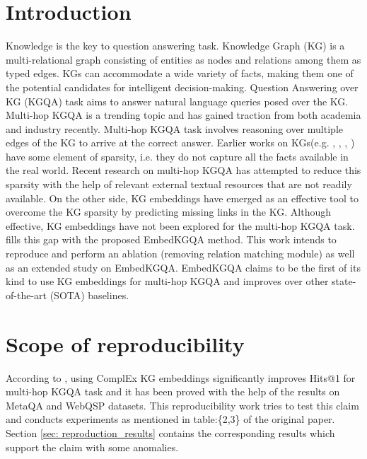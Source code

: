 
\section{Introduction}

Knowledge is the key to question answering task. Knowledge Graph (KG) is a multi-relational
graph consisting of entities as nodes and relations among them as typed edges. KGs can accommodate a wide variety of facts, making them one of the potential candidates for intelligent decision-making. Question Answering over KG (KGQA) task aims to answer natural language queries posed over the KG. Multi-hop KGQA is a trending topic and has gained traction from both academia and industry recently. Multi-hop KGQA task involves reasoning over multiple edges of the KG to arrive at the correct answer. Earlier works on KGs(e.g. \cite{yago}, \cite{freebase:datadumps}, \cite{dbpedia2015}, \cite{NELL}) have some element of sparsity, i.e. they do not capture all the facts available in the real world. Recent research on multi-hop KGQA has attempted to reduce this sparsity with the help of relevant external textual resources that are not readily available. On the other side, KG embeddings have emerged as an effective tool to overcome the KG sparsity by predicting missing links in the KG. Although effective, KG embeddings have not been explored for the multi-hop KGQA task. \cite{saxena-etal-2020-improving} fills this gap with the proposed EmbedKGQA method. This work intends to reproduce and perform an ablation (removing relation matching module) as well as an extended study on EmbedKGQA\cite{saxena-etal-2020-improving}. EmbedKGQA claims to be the first of its kind to use KG embeddings for multi-hop KGQA and improves over other state-of-the-art (SOTA) baselines.

\section{Scope of reproducibility}
\label{sec:claims}

According to \cite{saxena-etal-2020-improving}, using ComplEx \cite{ComplEx2016} KG embeddings significantly improves Hits@1 for multi-hop KGQA task and it has been proved with the help of the results on MetaQA \cite{metaqa-dataset} and WebQSP \cite{webqsp-dataset} datasets. This reproducibility work tries to test this claim and conducts experiments as mentioned in table:\{2,3\} of the original paper. Section \ref{sec: reproduction_results} contains the corresponding results which support the claim with some anomalies.

